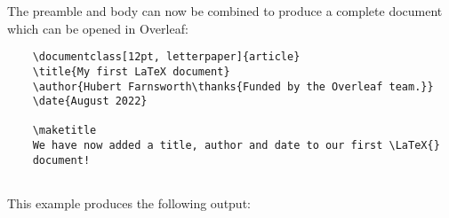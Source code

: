 The preamble and body can now be combined to produce a complete document which can be opened in Overleaf:

\begin{tcolorbox}
\begin{verbatim}
    \documentclass[12pt, letterpaper]{article}
    \title{My first LaTeX document}
    \author{Hubert Farnsworth\thanks{Funded by the Overleaf team.}}
    \date{August 2022}
    
    \maketitle
    We have now added a title, author and date to our first \LaTeX{}
    document!
    
\end{verbatim}
\end{tcolorbox}

This example produces the following output:

